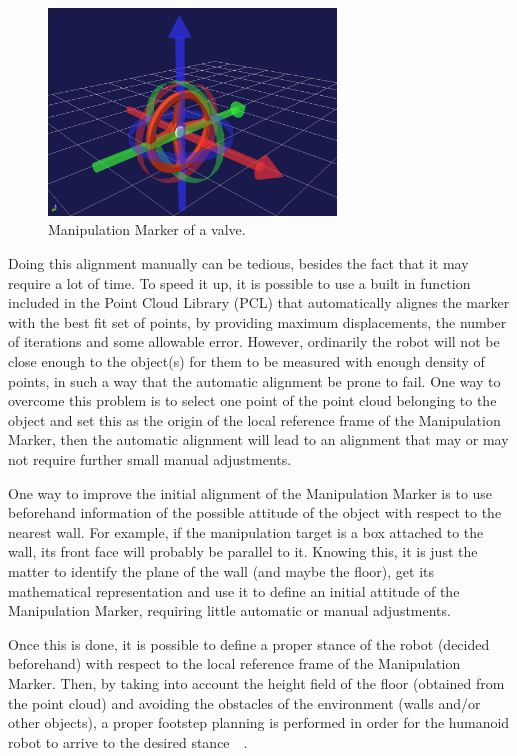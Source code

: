 		\begin{figure}[b]
			\centering
			\includegraphics[height = 5.5cm]{img/ManipulationMarker}
			\caption{Manipulation Marker of a valve.}
			\label{fig:ManipulationMarker}
		\end{figure}

		Doing this alignment manually can be tedious, besides the fact that it may require a lot of time.
		To speed it up, it is possible to use a built in function included in the Point Cloud Library (PCL) that
		automatically alignes the marker with the best fit set of points, by providing maximum displacements,
		the number of iterations and some allowable error.
		However, ordinarily the robot will not be close enough to the object(s) for them to be measured with enough
		density of points, in such a way that the automatic alignment be prone to fail.
		One way to overcome this problem is to select one point of the point cloud belonging to the object and set
		this as the origin of the local reference frame of the Manipulation Marker, then the automatic alignment
		will lead to an alignment that may or may not require further small manual adjustments.
		
		One way to improve the initial alignment of the Manipulation Marker is to use beforehand information of the
		possible attitude of the object with respect to the nearest wall.
		For example, if the manipulation target is a box attached to the wall, its front face will probably be
		parallel to it.
		Knowing this, it is just the matter to identify the plane of the wall (and maybe the floor),
		get its mathematical representation and use it to define an initial attitude of the Manipulation Marker,
		requiring little automatic or manual adjustments.
		
		Once this is done, it is possible to define a proper stance of the robot (decided beforehand) with respect
		to the local reference frame of the Manipulation Marker.
		Then, by taking into account the height field of the floor (obtained from the point cloud) and avoiding the
		obstacles of the environment (walls and/or other objects), a proper footstep planning is performed in order
		for the humanoid robot to arrive to the desired stance~\cite{Morisawa}~\cite{Perrin}.
		
